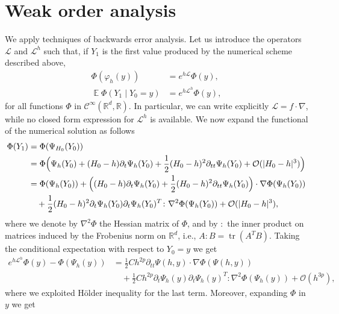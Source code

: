 \documentclass{siamart1116}
\numberwithin{theorem}{section}
\DeclarePairedDelimiter{\abs}{\lvert}{\rvert}
\renewcommand{\phi}{\varphi}
\newcommand{\R}{\mathbb{R}}
\newcommand{\OO}{\mathcal{O}}
\newcommand{\diffL}{\mathcal{L}}
\newcommand{\E}{\operatorname{\mathbb{E}}}
\newcommand{\trace}{\operatorname{tr}}
\begin{document}
\section{Weak order analysis}

We apply techniques of backwards error analysis. Let us introduce the operators $\diffL$ and $\diffL^h$ such that, if $Y_1$ is the first value produced by the numerical scheme described above, 
\begin{equation}
\begin{aligned}
	\Phi(\phi_h(y)) &= e^{h\diffL}\Phi(y),\\
	\E \Phi(Y_1\mid Y_0 = y) &= e^{h\diffL^h}\Phi(y),
\end{aligned}
\end{equation}
for all functions $\Phi$ in $\mathcal{C}^{\infty}(\R^d, \R)$. In particular, we can write explicitly $\diffL = f\cdot \nabla$, while no closed form expression for $\diffL^h$ is available. We now expand the functional of the numerical solution as follows
\begin{equation}
\begin{aligned}
	\Phi(Y_1) &= \Phi(\Psi_{H_0}(Y_0)) \\
	&= \Phi\Big(\Psi_h(Y_0) + (H_0-h)\partial_t\Psi_h(Y_0) + \frac{1}{2}(H_0-h)^2\partial_{tt}\Psi_h(Y_0) + \OO(\abs{H_0 - h}^3)\Big)\\
	&= \Phi(\Psi_h(Y_0)) + \Big((H_0 - h)\partial_t\Psi_h(Y_0)+\frac{1}{2}(H_0-h)^2\partial_{tt}\Psi_h(Y_0)\Big) \cdot \nabla\Phi(\Psi_h(Y_0))\\
	&\quad + \frac{1}{2}(H_0 - h)^2 \partial_t \Psi_h(Y_0) \partial_t \Psi_h(Y_0)^T \colon \nabla^2\Phi(\Psi_h(Y_0)) + \OO(\abs{H_0 - h}^3),
\end{aligned}
\end{equation}
where we denote by $\nabla^2\Phi$ the Hessian matrix of $\Phi$, and by $\colon$ the inner product on matrices induced by the Frobenius norm on $\R^d$, i.e., $A\colon B = \trace(A^TB)$. Taking the conditional expectation with respect to $Y_0 = y$ we get
\begin{equation}
\begin{aligned}
	e^{h\diffL^h}\Phi(y) - \Phi(\Psi_h(y)) &= \frac{1}{2} Ch^{2p}\partial_{tt}\Psi(h,y)\cdot \nabla\Phi(\Psi(h,y))\\
	&\quad + \frac{1}{2} Ch^{2p}\partial_t \Psi_h(y) \partial_t \Psi_h(y)^T \colon \nabla^2\Phi(\Psi_h(y)) + \OO(h^{3p}),
\end{aligned}
\end{equation}
where we exploited Hölder inequality for the last term. Moreover, expanding $\Phi$ in $y$ we get
\end{document}
